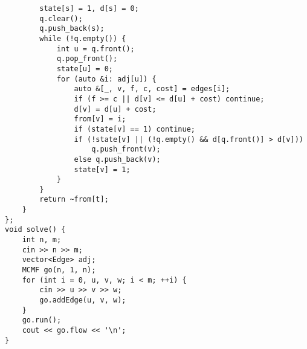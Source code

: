 \documentclass[twoside]{article}
\begin{document}
\begin{multicols*}{2}
\begin{verbatim}
        state[s] = 1, d[s] = 0;
        q.clear();
        q.push_back(s);
        while (!q.empty()) {
            int u = q.front();
            q.pop_front();
            state[u] = 0;
            for (auto &i: adj[u]) {
                auto &[_, v, f, c, cost] = edges[i];
                if (f >= c || d[v] <= d[u] + cost) continue;
                d[v] = d[u] + cost;
                from[v] = i;
                if (state[v] == 1) continue;
                if (!state[v] || (!q.empty() && d[q.front()] > d[v]))
                    q.push_front(v);
                else q.push_back(v);
                state[v] = 1;
            }
        }
        return ~from[t];
    }
};
void solve() {
    int n, m;
    cin >> n >> m;
    vector<Edge> adj;
    MCMF go(n, 1, n);
    for (int i = 0, u, v, w; i < m; ++i) {
        cin >> u >> v >> w;
        go.addEdge(u, v, w);
    }
    go.run();
    cout << go.flow << '\n';
}
\end{verbatim}

{
}
\end{multicols*}
\end{document}
